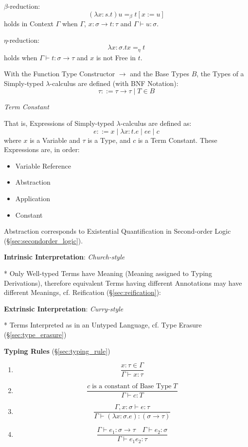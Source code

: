 $\beta$-reduction:
\[
  (\lambda x:s.t)u =_\beta t[x := u]
\]
holds in Context $\Gamma$ when $\Gamma$, $x:\sigma \rightarrow t:\tau$
and $\Gamma \vdash u:\sigma$.

$\eta$-reduction:
\[
  \lambda x:\sigma .t x =_\eta t
\]
holds when $\Gamma \vdash t : \sigma \rightarrow \tau$ and $x$ is not
Free in $t$.

With the Function Type Constructor $\rightarrow$ and the Base Types
$B$, the Types of a Simply-typed $\lambda$-calculus are defined (with
BNF Notation):
\[
  \tau ::= \tau \rightarrow \tau \;|\; T \in B
\]

\emph{Term Constant}

That is, Expressions of Simply-typed $\lambda$-calculus are defined
as:
\[
  e ::= x \;|\; \lambda x:t.e \;|\; e e \;|\; c
\]
where $x$ is a Variable and $\tau$ is a Type, and $c$ is a Term
Constant. These Expressions are, in order:
\begin{itemize}
  \item Variable Reference
  \item Abstraction
  \item Application
  \item Constant
\end{itemize}

Abstraction corresponds to Existential Quantification in Second-order
Logic (\S\ref{sec:secondorder_logic}).



\textbf{Intrinsic Interpretation}: \emph{Church-style}

* Only Well-typed Terms have Meaning (Meaning assigned to Typing
Derivations), therefore equivalent Terms having different Annotations
may have different Meanings, cf. Reification
(\S\ref{sec:reification}):



\textbf{Extrinsic Interpretation}: \emph{Curry-style}

* Terms Interpreted as in an Untyped Language, cf. Type Erasure
(\S\ref{sec:type_erasure})



\textbf{Typing Rules} (\S\ref{sec:typing_rule})

\begin{enumerate}
\item
  \[
    {
      \frac
      {x : \tau \in \Gamma}
      {\Gamma \vdash x : \tau}
    }
  \]
\item
  \[
    {
      \frac
      {c \;\text{is a constant of Base Type}\; T}
      {\Gamma \vdash c:T}
    }
  \]
\item
  \[
    {
      \frac
      {\Gamma, x:\sigma \vdash e:\tau}
      {\Gamma \vdash (\lambda x:\sigma.e):(\sigma \rightarrow \tau)}
    }
  \]
\item
  \[
    {
      \frac
      {\Gamma \vdash e_1:\sigma \rightarrow \tau \quad
        \Gamma \vdash e_2:\sigma}
      {\Gamma \vdash e_1 e_2 : \tau}
    }
  \]
\end{enumerate}



